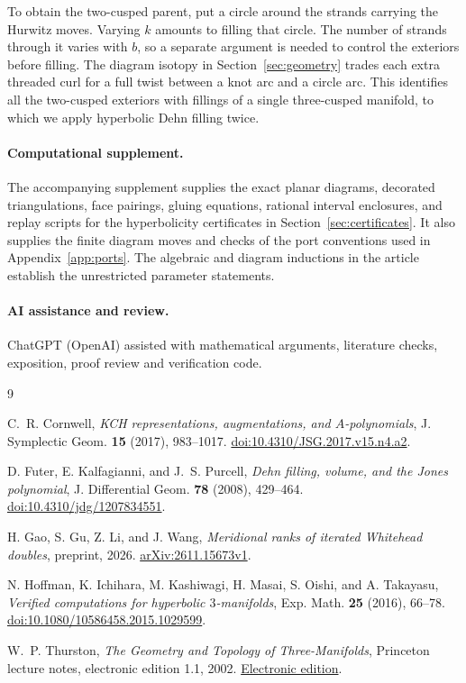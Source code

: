 \documentclass[11pt]{article}
\theoremstyle{remark}
\begin{document}
To obtain the two-cusped parent, put a circle around the strands
carrying the Hurwitz moves. Varying \(k\) amounts to filling that
circle. The number of strands through it varies with \(b\), so a separate
argument is needed to control the exteriors before filling. The
diagram isotopy in Section~\ref{sec:geometry} trades each extra
threaded curl for a full twist between a knot arc and a circle arc.
This identifies all the two-cusped exteriors with fillings of a
single three-cusped manifold, to which we apply hyperbolic Dehn
filling twice.





\paragraph{Computational supplement.}
The accompanying supplement supplies the exact planar diagrams,
decorated triangulations, face pairings, gluing equations, rational
interval enclosures, and replay scripts for the hyperbolicity
certificates in Section~\ref{sec:certificates}. It also supplies the
finite diagram moves and checks of the port conventions used in
Appendix~\ref{app:ports}. The algebraic and diagram inductions in the
article establish the unrestricted parameter statements.

\paragraph{AI assistance and review.}
ChatGPT (OpenAI) assisted with mathematical arguments, literature checks,
exposition, proof review and verification code.

\appendix


\begin{thebibliography}{9}
\raggedright
{}
C.~R. Cornwell, \emph{KCH representations, augmentations, and
\(A\)-polynomials}, J. Symplectic Geom. \textbf{15} (2017), 983--1017.
\href{https://doi.org/10.4310/JSG.2017.v15.n4.a2}{doi:10.4310/JSG.2017.v15.n4.a2}.

D. Futer, E. Kalfagianni, and J.~S. Purcell, \emph{Dehn filling, volume,
and the Jones polynomial}, J. Differential Geom. \textbf{78} (2008),
429--464. \href{https://doi.org/10.4310/jdg/1207834551}{doi:10.4310/jdg/1207834551}.

H. Gao, S. Gu, Z. Li, and J. Wang, \emph{Meridional ranks of iterated
Whitehead doubles}, preprint, 2026.
\href{https://arxiv.org/abs/2611.15673v1}{arXiv:2611.15673v1}.

N. Hoffman, K. Ichihara, M. Kashiwagi, H. Masai, S. Oishi, and
A. Takayasu, \emph{Verified computations for hyperbolic \(3\)-manifolds},
Exp. Math. \textbf{25} (2016), 66--78.
\href{https://doi.org/10.1080/10586458.2015.1029599}{doi:10.1080/10586458.2015.1029599}.

W.~P. Thurston, \emph{The Geometry and Topology of Three-Manifolds},
Princeton lecture notes, electronic edition 1.1, 2002.
\href{https://library.slmath.org/nonmsri/gt3m/}{Electronic edition}.
\end{thebibliography}
\end{document}
